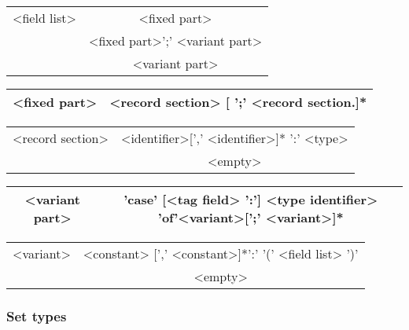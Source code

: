 \vspace{0.3cm}
{\centering \begin{tabular}{|c|c|}
\hline 
<field list>&
<fixed part>\\
&
<fixed part>';' <variant part>\\
&
<variant part>\\
\hline 
\end{tabular}\par}
\vspace{0.3cm}

\vspace{0.3cm}
{\centering \begin{tabular}{|c|c|}
\hline 
<fixed part>&
<record section> {[} ';' <record section.{]}{*}\\
\hline 
\end{tabular}\par}
\vspace{0.3cm}

\vspace{0.3cm}
{\centering \begin{tabular}{|c|c|}
\hline 
<record section>&
<identifier>{[}',' <identifier>{]}{*} ':' <type>\\
&
<empty>\\
\hline 
\end{tabular}\par}
\vspace{0.3cm}

\vspace{0.3cm}
{\centering \begin{tabular}{|c|c|}
\hline 
<variant part>&
'case' {[}<tag field> ':'{]} <type identifier> 'of'<variant>{[}';' <variant>{]}{*}\\
\hline 
\end{tabular}\par}
\vspace{0.3cm}

\vspace{0.3cm}
{\centering \begin{tabular}{|c|c|}
\hline 
<variant>&
<constant> {[}',' <constant>{]}{*}':' '(' <field list> ')'\\
&
<empty>\\
\hline 
\end{tabular}\par}
\vspace{0.3cm}


\subsubsection{Set types}

